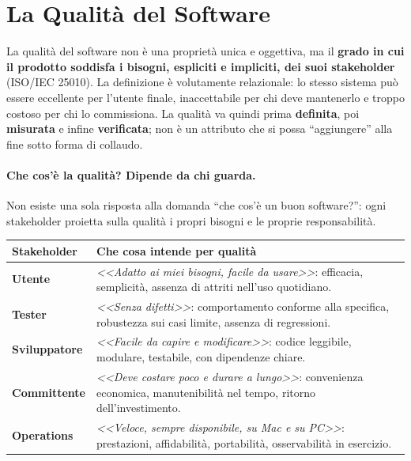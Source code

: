 \documentclass[12pt]{extarticle}
\begin{document}

\newpage

\section{La Qualità del Software}\label{sec:qualita-software}

\noindent La qualità del software non è una proprietà unica e oggettiva, ma il \textbf{grado in cui il prodotto soddisfa i bisogni, espliciti e impliciti, dei suoi stakeholder} (ISO/IEC 25010). La definizione è volutamente relazionale: lo stesso sistema può essere eccellente per l'utente finale, inaccettabile per chi deve mantenerlo e troppo costoso per chi lo commissiona. La qualità va quindi prima \textbf{definita}, poi \textbf{misurata} e infine \textbf{verificata}; non è un attributo che si possa ``aggiungere'' alla fine sotto forma di collaudo.

\paragraph{Che cos'è la qualità? Dipende da chi guarda.}
Non esiste una sola risposta alla domanda ``che cos'è un buon software?'': ogni stakeholder proietta sulla qualità i propri bisogni e le proprie responsabilità.

\begin{center}
\small
\begin{tabular}{p{3.2cm}p{12.4cm}}
    \toprule
    \textbf{Stakeholder} & \textbf{Che cosa intende per qualità} \\
    \midrule
    \textbf{Utente} & \textit{<<Adatto ai miei bisogni, facile da usare>>}: efficacia, semplicità, assenza di attriti nell'uso quotidiano. \\
    \addlinespace
    \textbf{Tester} & \textit{<<Senza difetti>>}: comportamento conforme alla specifica, robustezza sui casi limite, assenza di regressioni. \\
    \addlinespace
    \textbf{Sviluppatore} & \textit{<<Facile da capire e modificare>>}: codice leggibile, modulare, testabile, con dipendenze chiare. \\
    \addlinespace
    \textbf{Committente} & \textit{<<Deve costare poco e durare a lungo>>}: convenienza economica, manutenibilità nel tempo, ritorno dell'investimento. \\
    \addlinespace
    \textbf{Operations} & \textit{<<Veloce, sempre disponibile, su Mac e su PC>>}: prestazioni, affidabilità, portabilità, osservabilità in esercizio. \\
    \bottomrule
\end{tabular}
\end{center}
\end{document}
